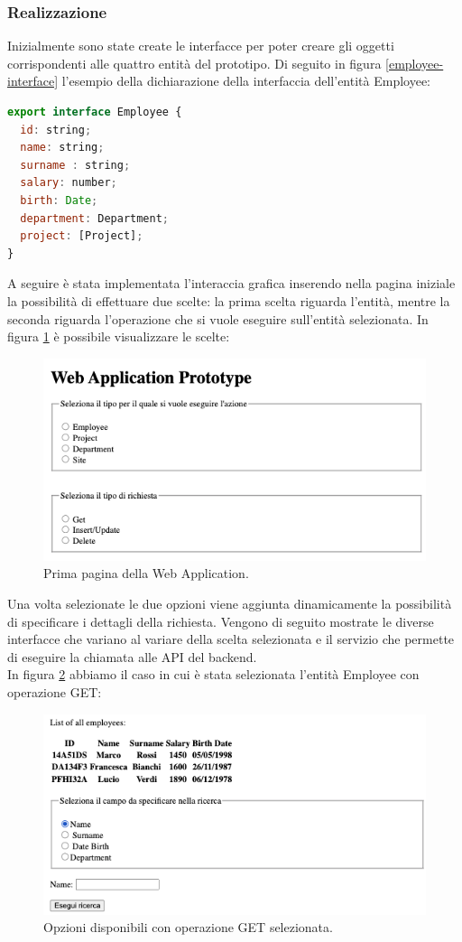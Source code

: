 \subsubsection*{Realizzazione}
Inizialmente sono state create le interfacce per poter creare gli oggetti corrispondenti alle quattro entità del prototipo. Di seguito in figura \ref{employee-interface} l'esempio della dichiarazione della interfaccia dell'entità Employee:
\begin{lstlisting}[language=JavaScript]
export interface Employee {
  id: string;
  name: string;
  surname : string;
  salary: number;
  birth: Date;
  department: Department;
  project: [Project];
}
\end{lstlisting}
A seguire è stata implementata l'interaccia grafica inserendo nella pagina iniziale la possibilità di effettuare due scelte: la prima scelta riguarda l'entità, mentre la seconda riguarda l'operazione che si vuole eseguire sull'entità selezionata. In figura \ref{first-page} è possibile visualizzare le scelte:
\FloatBarrier
\begin{figure}[!ht]
\centering
\includegraphics[width=0.7\linewidth]{immagini/firstPage.png}
\caption{Prima pagina della Web Application.}
\label{first-page}
\end{figure}
\FloatBarrier
Una volta selezionate le due opzioni viene aggiunta dinamicamente la possibilità di specificare i dettagli della richiesta. Vengono di seguito mostrate le diverse interfacce che variano al variare della scelta selezionata e il servizio che permette di eseguire la chiamata alle API del backend.\\
In figura \ref{get-employee} abbiamo il caso in cui è stata selezionata l'entità Employee con operazione GET:
\FloatBarrier
\begin{figure}[!ht]
\centering
\includegraphics[width=0.7\linewidth]{immagini/getEmployee.png}
\caption{Opzioni disponibili con operazione GET selezionata.}
\label{get-employee}
\end{figure}
